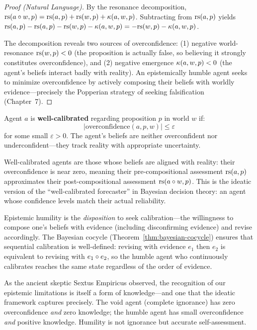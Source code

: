 \begin{proof}[Proof (Natural Language)]
By the resonance decomposition, $\mathrm{rs}(a \circ w, p) = \mathrm{rs}(a, p) + \mathrm{rs}(w, p) +
\kappa(a, w, p)$. Subtracting from $\mathrm{rs}(a, p)$ yields
$\mathrm{rs}(a, p) - \mathrm{rs}(a, p) - \mathrm{rs}(w, p) - \kappa(a, w, p) = -\mathrm{rs}(w, p) - \kappa(a, w, p)$.

The decomposition reveals two sources of overconfidence: (1) negative world-resonance
$\mathrm{rs}(w, p) < 0$ (the proposition is actually false, so believing it strongly constitutes
overconfidence), and (2) negative emergence $\kappa(a, w, p) < 0$ (the agent's beliefs
interact badly with reality). An epistemically humble agent seeks to minimize
overconfidence by actively composing their beliefs with worldly evidence---precisely
the Popperian strategy of seeking falsification (Chapter~7).
\end{proof}

\begin{definition}[Calibration]
\label{def:calibration}
Agent $a$ is \textbf{well-calibrated} regarding proposition $p$ in world $w$ if:
\[
  |\mathrm{overconfidence}(a, p, w)| \leq \varepsilon
\]
for some small $\varepsilon > 0$. The agent's beliefs are neither overconfident
nor underconfident---they track reality with appropriate uncertainty.
\end{definition}

\begin{interpretation}
Well-calibrated agents are those whose beliefs are aligned with reality: their
overconfidence is near zero, meaning their pre-compositional assessment
$\mathrm{rs}(a, p)$ approximates their post-compositional assessment $\mathrm{rs}(a \circ w, p)$.
This is the ideatic version of the ``well-calibrated forecaster'' in Bayesian
decision theory: an agent whose confidence levels match their actual reliability.

Epistemic humility is the \emph{disposition} to seek calibration---the
willingness to compose one's beliefs with evidence (including disconfirming
evidence) and revise accordingly. The Bayesian cocycle
(Theorem~\ref{thm:bayesian-cocycle}) ensures that sequential calibration is
well-defined: revising with evidence $e_1$ then $e_2$ is equivalent to
revising with $e_1 \circ e_2$, so the humble agent who continuously
calibrates reaches the same state regardless of the order of evidence.

As the ancient skeptic Sextus Empiricus observed, the recognition of our
epistemic limitations is itself a form of knowledge---and one that the ideatic
framework captures precisely. The void agent (complete ignorance) has zero
overconfidence \emph{and} zero knowledge; the humble agent has small overconfidence
\emph{and} positive knowledge. Humility is not ignorance but accurate self-assessment.
\end{interpretation}

